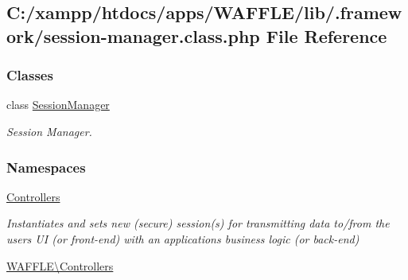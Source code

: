 \hypertarget{session-manager_8class_8php}{}\subsection{C\+:/xampp/htdocs/apps/\+W\+A\+F\+F\+L\+E/lib/.framework/session-\/manager.class.\+php File Reference}
\label{session-manager_8class_8php}
\subsubsection*{Classes}
\begin{DoxyCompactItemize}
\item 
class \hyperlink{class_w_a_f_f_l_e_1_1_controllers_1_1_session_manager}{Session\+Manager}
\begin{DoxyCompactList}\small\item\em Session Manager. \end{DoxyCompactList}\end{DoxyCompactItemize}
\subsubsection*{Namespaces}
\begin{DoxyCompactItemize}
\item 
 \hyperlink{namespace_controllers}{Controllers}
\begin{DoxyCompactList}\small\item\em Instantiates and sets new (secure) session(s) for transmitting data to/from the user\textquotesingle{}s UI (or front-\/end) with an application\textquotesingle{}s business logic (or back-\/end) \end{DoxyCompactList}\item 
 \hyperlink{namespace_w_a_f_f_l_e_1_1_controllers}{W\+A\+F\+F\+L\+E\textbackslash{}\+Controllers}
\end{DoxyCompactItemize}
